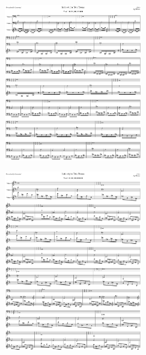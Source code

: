 \begin{figure}[H]                                             
{                                                             
  \setlength{\tabcolsep}{3.0pt}                               
  \setlength\cmidrulewidth{\heavyrulewidth} %
    \begin{subfigure}{0.5\textwidth}                            
  \includegraphics[width=6cm]{music/title_no_77_page_1001.png}%
    \end{subfigure}                                             
  \begin{subfigure}{0.5\textwidth}                            
  \includegraphics[width=6cm]{music/title_no_78_page_1001.png}%
    \end{subfigure}                                             
}                                                             
\end{figure}                                                  


